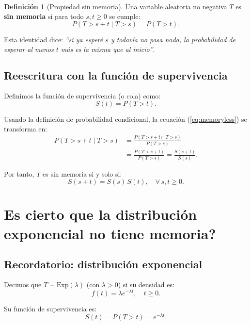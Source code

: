 \documentclass{article}
\theoremstyle{plain}
\theoremstyle{definition}
\newtheorem{definition}{Definición}
\begin{document}
\begin{definition}[Propiedad sin memoria]
Una variable aleatoria no negativa $T$ es \textbf{sin memoria} si para todo $s,t \ge 0$ se cumple:
\begin{equation} \label{eq:memoryless}
P(T > s+t \mid T > s) = P(T > t).
\end{equation}
\end{definition}

Esta identidad dice: \emph{``si ya esperé $s$ y todavía no pasa nada, la probabilidad de esperar al menos $t$ más es la misma que al inicio''}.

\subsection*{Reescritura con la función de supervivencia}

Definimos la función de supervivencia (o cola) como:
$$ S(t) = P(T > t). $$

Usando la definición de probabilidad condicional, la ecuación (\ref{eq:memoryless}) se transforma en:
\begin{align*}
P(T > s+t \mid T > s)
&= \frac{P(T > s+t \cap T > s)}{P(T > s)} \\
&= \frac{P(T > s+t)}{P(T > s)}
= \frac{S(s+t)}{S(s)}.
\end{align*}

Por tanto, $T$ es sin memoria si y solo si:
\begin{equation} \label{eq:survival_cauchy}
S(s+t) = S(s)\,S(t), \quad \forall\, s,t \ge 0.
\end{equation}

\section*{\textquestiondown Es cierto que la distribución exponencial no tiene memoria?}

\subsection*{Recordatorio: distribución exponencial}

Decimos que $T \sim \mathrm{Exp}(\lambda)$ (con $\lambda > 0$) si su densidad es:
$$ f(t) = \lambda e^{-\lambda t}, \quad t \ge 0. $$

Su función de supervivencia es:
\begin{equation} \label{eq:exp_survival}
S(t) = P(T > t) = e^{-\lambda t}.
\end{equation}
\end{document}
